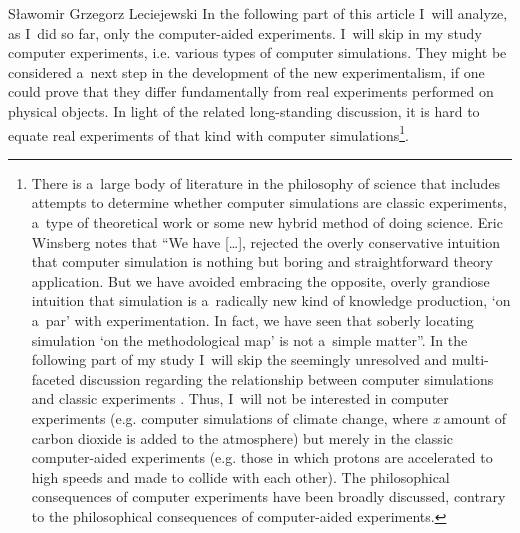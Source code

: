\begin{artengenv}{Sławomir Grzegorz Leciejewski}
In the following part of this article I~will analyze, as I~did so far, only the computer-aided experiments. I~will skip in my study computer experiments, i.e. various types of computer simulations. They might be considered a~next step in the development of the new experimentalism, if one could prove that they differ fundamentally from real experiments performed on physical objects. In light of the related long-standing discussion, it is hard to equate real experiments of that kind with computer simulations\footnote{There is a~large body of literature in the philosophy of science that includes attempts to determine whether computer simulations are classic experiments, a~type of theoretical work or some new hybrid method of doing science.
Eric Winsberg
\parencite*[][p.136]{winsberg_science_2010}
 notes that ``We have […], rejected the overly conservative intuition that computer simulation is nothing but boring and straightforward theory application. But we have avoided embracing the opposite, overly grandiose intuition that simulation is a~radically new kind of knowledge production, ‘on a~par' with experimentation. In fact, we have seen that soberly locating simulation ‘on the methodological map' is not a~simple matter''. In the following part of my study I~will skip the seemingly unresolved and multi-faceted discussion regarding the relationship between computer simulations and classic experiments
\parencites[][]{kaufmann_supercomputing_1993}[][]{humphreys_computational_1995}[][]{morgan_ising_1999}[][]{miller_why_2001}[][]{guala_models_2002}[][]{guala_paradigmatic_2008}[][]{morgan_experiments_2003}[][]{gilbert_simulation_2005}[][]{giere_is_2009}[][]{morrison_models_2009}[][]{parker_does_2009}[][]{parker_computer_2017}[][]{peschard_modeling_2009}[][]{winsberg_tale_2009}[][]{parke_experiments_2014}%
. Thus, I~will not be interested in computer experiments (e.g. computer simulations of climate change, where \textit{x} amount of carbon dioxide is added to the atmosphere) but merely in the classic computer-aided experiments (e.g. those in which protons are accelerated to high speeds and made to collide with each other). The philosophical consequences of computer experiments have been broadly discussed, contrary to the philosophical consequences of computer-aided experiments.}.




\end{artengenv}
